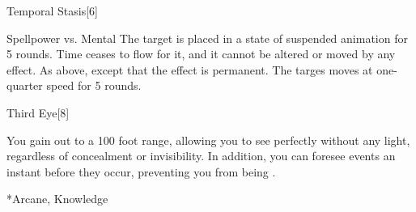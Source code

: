 \begin{spellsection}{Temporal Stasis}[6]
    \begin{spellheader}
    \end{spellheader}
    \begin{spellcontent}
        \begin{spelltargetinginfo}
        \end{spelltargetinginfo}
        \begin{spelleffects}
            \begin{spellattack}{Spellpower vs. Mental}
                \spellsuccess The target is placed in a state of suspended animation for 5 rounds. Time ceases to flow for it, and it cannot be altered or moved by any effect.
                \spellcritical As above, except that the effect is permanent.
                \spellfailure The targes moves at one-quarter speed for 5 rounds.
            \end{spellattack}
        \end{spelleffects}
    \end{spellcontent}
    \begin{spellfooter}
        \miscastrandom
    \end{spellfooter}
    \begin{spellaugments}
    \end{spellaugments}
\end{spellsection}

\begin{spellsection}{Third Eye}[8]
    \begin{spellheader}
    \end{spellheader}
    \begin{spellcontent}
        \begin{spelltargetinginfo}
        \end{spelltargetinginfo}
        \begin{spelleffects}
            \spelleffect You gain  out to a 100 foot range, allowing you to see perfectly without any light, regardless of concealment or invisibility. In addition, you can foresee events an instant before they occur, preventing you from being \unaware.
            \spelldur \durlong
        \end{spelleffects}
    \end{spellcontent}
    \begin{spellfooter}
        *{Arcane, Knowledge}
        \miscastexplode
    \end{spellfooter}
    \begin{spellaugments}
    \end{spellaugments}
\end{spellsection}


